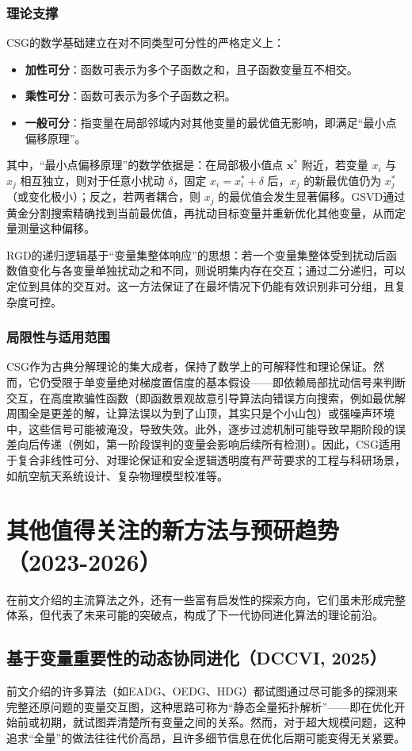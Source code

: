 \subsubsection{理论支撑}
CSG的数学基础建立在对不同类型可分性的严格定义上：
\begin{itemize}
    \item \textbf{加性可分}：函数可表示为多个子函数之和，且子函数变量互不相交。
    \item \textbf{乘性可分}：函数可表示为多个子函数之积。
    \item \textbf{一般可分}：指变量在局部邻域内对其他变量的最优值无影响，即满足“最小点偏移原理”。
\end{itemize}
其中，“最小点偏移原理”的数学依据是：在局部极小值点 $\mathbf{x}^*$ 附近，若变量 $x_i$ 与 $x_j$ 相互独立，则对于任意小扰动 $\delta$，固定 $x_i = x_i^* + \delta$ 后，$x_j$ 的新最优值仍为 $x_j^*$（或变化极小）；反之，若两者耦合，则 $x_j$ 的最优值会发生显著偏移。GSVD通过黄金分割搜索精确找到当前最优值，再扰动目标变量并重新优化其他变量，从而定量测量这种偏移。

RGD的递归逻辑基于“变量集整体响应”的思想：若一个变量集整体受到扰动后函数值变化与各变量单独扰动之和不同，则说明集内存在交互；通过二分递归，可以定位到具体的交互对。这一方法保证了在最坏情况下仍能有效识别非可分组，且复杂度可控。

\subsubsection{局限性与适用范围}
CSG作为古典分解理论的集大成者，保持了数学上的可解释性和理论保证。然而，它仍受限于单变量绝对梯度置信度的基本假设——即依赖局部扰动信号来判断交互，在高度欺骗性函数（即函数景观故意引导算法向错误方向搜索，例如最优解周围全是更差的解，让算法误以为到了山顶，其实只是个小山包）或强噪声环境中，这些信号可能被淹没，导致失效。此外，逐步过滤机制可能导致早期阶段的误差向后传递（例如，第一阶段误判的变量会影响后续所有检测）。因此，CSG适用于复合非线性可分、对理论保证和安全逻辑透明度有严苛要求的工程与科研场景，如航空航天系统设计、复杂物理模型校准等。

\section{其他值得关注的新方法与预研趋势（2023-2026）}

在前文介绍的主流算法之外，还有一些富有启发性的探索方向，它们虽未形成完整体系，但代表了未来可能的突破点，构成了下一代协同进化算法的理论前沿。

\subsection{基于变量重要性的动态协同进化（DCCVI, 2025）}
前文介绍的许多算法（如EADG、OEDG、HDG）都试图通过尽可能多的探测来完整还原问题的变量交互图，这种思路可称为“静态全量拓扑解析”——即在优化开始前或初期，就试图弄清楚所有变量之间的关系。然而，对于超大规模问题，这种追求“全量”的做法往往代价高昂，且许多细节信息在优化后期可能变得无关紧要。

